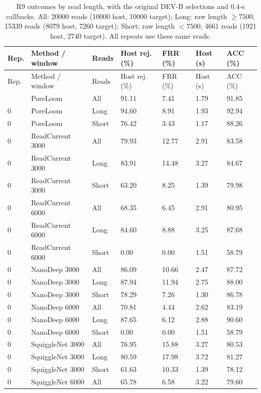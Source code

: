 \begin{longtable}{lllllll}
\caption{R9 outcomes by read length, with the original DEV-B selections and 0.4-s callbacks. All: 20000 reads (10000 host, 10000 target); Long: raw length $\geq7500$, 15339 reads (8079 host, 7260 target); Short: raw length $<7500$, 4661 reads (1921 host, 2740 target). All repeats use these same reads.}\label{tab:s_r9_length_strata}\\
\toprule
Rep. & Method / window & Reads & Host rej. (\%) & FRR (\%) & Host (s) & ACC (\%)\\\midrule\endfirsthead
\toprule
Rep. & Method / window & Reads & Host rej. (\%) & FRR (\%) & Host (s) & ACC (\%)\\\midrule\endhead
\bottomrule\endfoot
0 & PoreLoom & All & 91.11 & 7.41 & 1.79 & 91.85\\
0 & PoreLoom & Long & 94.60 & 8.91 & 1.93 & 92.94\\
0 & PoreLoom & Short & 76.42 & 3.43 & 1.17 & 88.26\\
0 & ReadCurrent 3000 & All & 79.93 & 12.77 & 2.91 & 83.58\\
0 & ReadCurrent 3000 & Long & 83.91 & 14.48 & 3.27 & 84.67\\
0 & ReadCurrent 3000 & Short & 63.20 & 8.25 & 1.39 & 79.98\\
0 & ReadCurrent 6000 & All & 68.35 & 6.45 & 2.91 & 80.95\\
0 & ReadCurrent 6000 & Long & 84.60 & 8.88 & 3.25 & 87.68\\
0 & ReadCurrent 6000 & Short & 0.00 & 0.00 & 1.51 & 58.79\\
0 & NanoDeep 3000 & All & 86.09 & 10.66 & 2.47 & 87.72\\
0 & NanoDeep 3000 & Long & 87.94 & 11.94 & 2.75 & 88.00\\
0 & NanoDeep 3000 & Short & 78.29 & 7.26 & 1.30 & 86.78\\
0 & NanoDeep 6000 & All & 70.81 & 4.44 & 2.62 & 83.19\\
0 & NanoDeep 6000 & Long & 87.65 & 6.12 & 2.88 & 90.60\\
0 & NanoDeep 6000 & Short & 0.00 & 0.00 & 1.51 & 58.79\\
0 & SquiggleNet 3000 & All & 76.95 & 15.88 & 3.27 & 80.53\\
0 & SquiggleNet 3000 & Long & 80.59 & 17.98 & 3.72 & 81.27\\
0 & SquiggleNet 3000 & Short & 61.63 & 10.33 & 1.39 & 78.12\\
0 & SquiggleNet 6000 & All & 65.78 & 6.58 & 3.22 & 79.60\\

\end{longtable}
